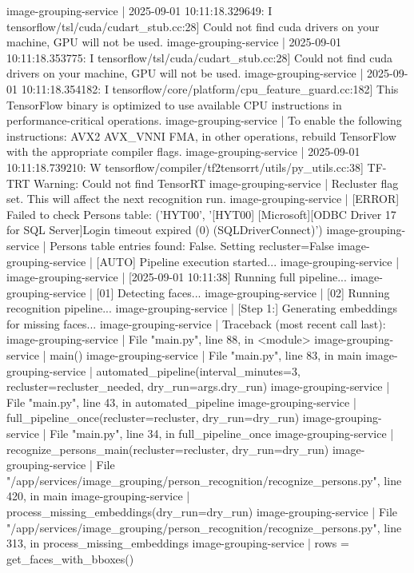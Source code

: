 image-grouping-service  | 2025-09-01 10:11:18.329649: I tensorflow/tsl/cuda/cudart_stub.cc:28] Could not find cuda drivers on your machine, GPU will not be used.
image-grouping-service  | 2025-09-01 10:11:18.353775: I tensorflow/tsl/cuda/cudart_stub.cc:28] Could not find cuda drivers on your machine, GPU will not be used.
image-grouping-service  | 2025-09-01 10:11:18.354182: I tensorflow/core/platform/cpu_feature_guard.cc:182] This TensorFlow binary is optimized to use available CPU instructions in performance-critical operations.
image-grouping-service  | To enable the following instructions: AVX2 AVX_VNNI FMA, in other operations, rebuild TensorFlow with the appropriate compiler flags.
image-grouping-service  | 2025-09-01 10:11:18.739210: W tensorflow/compiler/tf2tensorrt/utils/py_utils.cc:38] TF-TRT Warning: Could not find TensorRT
image-grouping-service  | Recluster flag set. This will affect the next recognition run.
image-grouping-service  | [ERROR] Failed to check Persons table: ('HYT00', '[HYT00] [Microsoft][ODBC Driver 17 for SQL Server]Login timeout expired (0) (SQLDriverConnect)')
image-grouping-service  | Persons table entries found: False. Setting recluster=False
image-grouping-service  | [AUTO] Pipeline execution started...
image-grouping-service  |
image-grouping-service  | [2025-09-01 10:11:38] Running full pipeline...
image-grouping-service  | [01] Detecting faces...
image-grouping-service  | [02] Running recognition pipeline...
image-grouping-service  | [Step 1:] Generating embeddings for missing faces...
image-grouping-service  | Traceback (most recent call last):
image-grouping-service  |   File "main.py", line 88, in <module>
image-grouping-service  |     main()
image-grouping-service  |   File "main.py", line 83, in main
image-grouping-service  |     automated_pipeline(interval_minutes=3, recluster=recluster_needed, dry_run=args.dry_run)
image-grouping-service  |   File "main.py", line 43, in automated_pipeline
image-grouping-service  |     full_pipeline_once(recluster=recluster, dry_run=dry_run)
image-grouping-service  |   File "main.py", line 34, in full_pipeline_once
image-grouping-service  |     recognize_persons_main(recluster=recluster, dry_run=dry_run)
image-grouping-service  |   File "/app/services/image_grouping/person_recognition/recognize_persons.py", line 420, in main
image-grouping-service  |     process_missing_embeddings(dry_run=dry_run)
image-grouping-service  |   File "/app/services/image_grouping/person_recognition/recognize_persons.py", line 313, in process_missing_embeddings
image-grouping-service  |     rows = get_faces_with_bboxes()
